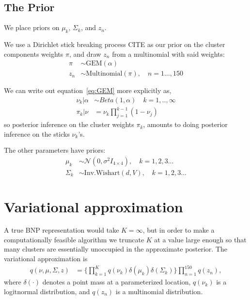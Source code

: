 \documentclass[a4paper]{article}
\begin{document}
\subsection{The Prior}
We place priors on $\mu_k$, $\Sigma_k$, and $z_n$. \par

We use a Dirichlet stick breaking process CITE as our prior on the cluster components
weights $\pi$, and draw $z_n$ from a multinomial with said weights:
\begin{align}
	\pi &\sim \text{GEM}(\alpha) \label{eq:GEM} \\
	 z_n &\sim \text{Multinomial}(\pi), \quad n = 1..., 150
\end{align}

We can write out equation~\ref{eq:GEM} more explicitly as,
\begin{align}
  \nu_k | \alpha &\sim Beta(1, \alpha) \quad k = 1, .., \infty \label{eq:beta_sticks}\\
  \pi_k | \nu &= \nu_k \prod_{j=1}^{k-1} (1 - \nu_j) \label{eq:stick_breaking}
\end{align}
so posterior inference on the cluster weights $\pi_k$, amounts to doing
posterior inference on the sticks $\nu_k$'s.

The other parameters have priors:
\begin{align}
	\mu_k &\sim \mathcal{N}(0, \sigma^2 I_{4\times 4}), \quad k = 1, 2, 3 ... \\
	\Sigma_k &\sim \text{Inv.Wishart}(d, V), \quad k = 1, 2, 3 ...
\end{align}


\section{Variational approximation}
A true BNP representation would take $K = \infty$, but in order to make a computationally feasible
algorithm we truncate $K$ at a value large enough so that many clusters are essentially unoccupied in
the approximate posterior. The variational approximation is
\begin{align}
q(\nu, \mu, \Sigma, z) & =
\Big\{\prod_{k=1}^{K}q\left(\nu_{k}\right)\delta\left(\mu_{k}\right)\delta\left(\Sigma_{k}\right)\Big\} \prod_{n=1}^{150}q\left(z_{n}\right),
\end{align}
where $\delta\left(\cdot\right)$ denotes a point mass at a parameterized
location, $q\left(\nu_{k}\right)$ is a logitnormal distribution, and $q\left(z_{n}\right)$
is a multinomial distribution.
\end{document}
